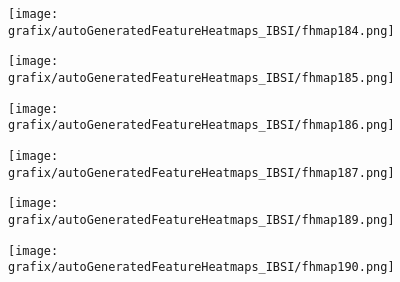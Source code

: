 \hspace{\hsp} 
\begin{subfigure}{\wid\textwidth} 
    \centering 
    \caption{\tiny \sffamily {}} 
    \vspace{\vsp} 
    \texttt{[image: grafix/autoGeneratedFeatureHeatmaps\_IBSI/fhmap184.png]} 
\end{subfigure} 
\hspace{\hsp} 
\begin{subfigure}{\wid\textwidth} 
    \centering 
    \caption{\tiny \sffamily {}} 
    \vspace{\vsp} 
    \texttt{[image: grafix/autoGeneratedFeatureHeatmaps\_IBSI/fhmap185.png]} 
\end{subfigure} 
\hspace{\hsp} 
\begin{subfigure}{\wid\textwidth} 
    \centering 
    \caption{\tiny \sffamily {}} 
    \vspace{\vsp} 
    \texttt{[image: grafix/autoGeneratedFeatureHeatmaps\_IBSI/fhmap186.png]} 
\end{subfigure} 
\hspace{\hsp} 
\begin{subfigure}{\wid\textwidth} 
    \centering 
    \caption{\tiny \sffamily {}} 
    \vspace{\vsp} 
    \texttt{[image: grafix/autoGeneratedFeatureHeatmaps\_IBSI/fhmap187.png]} 
\end{subfigure} 
\hspace{\hsp} 
\begin{subfigure}{\wid\textwidth} 
    \centering 
    \caption{\small \sffamily {}} 
\end{subfigure} 
\hspace{\hsp} 
\begin{subfigure}{\wid\textwidth} 
    \centering 
    \caption{\tiny \sffamily {}} 
    \vspace{\vsp} 
    \texttt{[image: grafix/autoGeneratedFeatureHeatmaps\_IBSI/fhmap189.png]} 
\end{subfigure} 
\hspace{\hsp} 
\begin{subfigure}{\wid\textwidth} 
    \centering 
    \caption{\tiny \sffamily {}} 
    \vspace{\vsp} 
    \texttt{[image: grafix/autoGeneratedFeatureHeatmaps\_IBSI/fhmap190.png]} 
\end{subfigure} 
